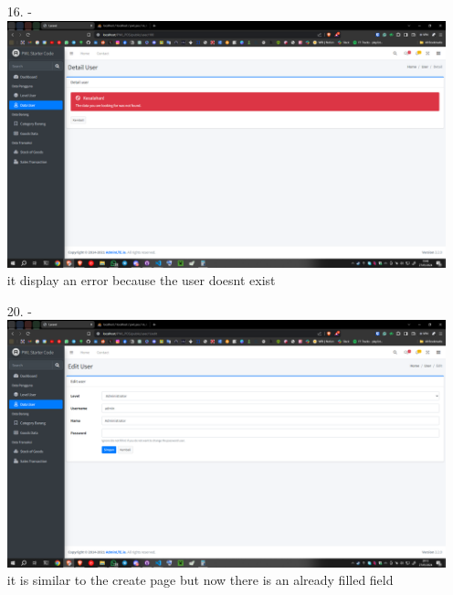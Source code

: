 \documentclass[12pt,titlepage]{article}
\begin{document}
\begin{enumerate}
    \item[16.] - \\ \includegraphics[width=.9\textwidth]{images/figures/Screenshot (464).png} \\ it display an error because the user doesnt exist
    \newpage
    \item[20.] - \\ \includegraphics[width=.9\textwidth]{images/figures/Screenshot (465).png} \\ it is similar to the create page but now there is an already filled field

\end{enumerate}
\end{document}
